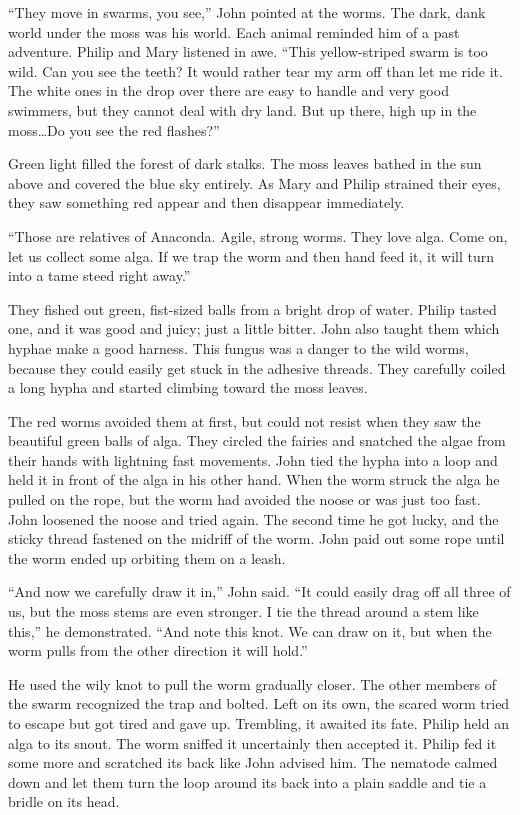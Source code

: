 \documentclass[10pt, draft]{memoir}
\begin{document}
``They move in swarms, you see,'' John pointed at the worms. The dark, dank world under the moss was his world. Each animal reminded him of a past adventure. Philip and Mary listened in awe. ``This yellow-striped swarm is too wild. Can you see the teeth? It would rather tear my arm off than let me ride it. The white ones in the drop over there are easy to handle and very good swimmers, but they cannot deal with dry land. But up there, high up in the moss\dots Do you see the red flashes?”

Green light filled the forest of dark stalks. The moss leaves bathed in the sun above and covered the blue sky entirely. As Mary and Philip strained their eyes, they saw something red appear and then disappear immediately.

``Those are relatives of Anaconda. Agile, strong worms. They love alga. Come on, let us collect some alga. If we trap the worm and then hand feed it, it will turn into a tame steed right away.”

They fished out green, fist-sized balls from a bright drop of water. Philip tasted one, and it was good and juicy; just a little bitter. John also taught them which hyphae make a good harness. This fungus was a danger to the wild worms, because they could easily get stuck in the adhesive threads. They carefully coiled a long hypha and started climbing toward the moss leaves.

The red worms avoided them at first, but could not resist when they saw the beautiful green balls of alga. They circled the fairies and snatched the algae from their hands with lightning fast movements. John tied the hypha into a loop and held it in front of the alga in his other hand. When the worm struck the alga he pulled on the rope, but the worm had avoided the noose or was just too fast. John loosened the noose and tried again. The second time he got lucky, and the sticky thread fastened on the midriff of the worm. John paid out some rope until the worm ended up orbiting them on a leash.

``And now we carefully draw it in,'' John said. ``It could easily drag off all three of us, but the moss stems are even stronger. I tie the thread around a stem like this,'' he demonstrated. ``And note this knot. We can draw on it, but when the worm pulls from the other direction it will hold.''

He used the wily knot to pull the worm gradually closer. The other members of the swarm recognized the trap and bolted. Left on its own, the scared worm tried to escape but got tired and gave up. Trembling, it awaited its fate. Philip held an alga to its snout. The worm sniffed it uncertainly then accepted it. Philip fed it some more and scratched its back like John advised him. The nematode calmed down and let them turn the loop around its back into a plain saddle and tie a bridle on its head.
\end{document}
